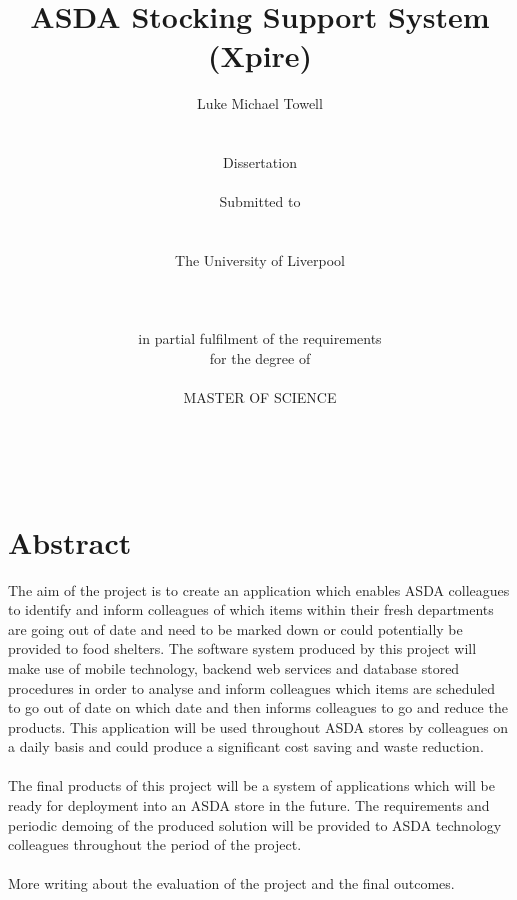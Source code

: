 \documentclass[a4paper,11pt]{report}
\begin{document}



\thispagestyle{empty}

\title{\LARGE
ASDA Stocking Support System (Xpire)}

\author{
Luke Michael Towell
\\    \\    \\
Dissertation
\\    \\
Submitted to 
\\    \\    \\ 
The University of Liverpool
\\    \\
\\    \\
in partial fulfilment of the requirements
\\
for the degree of 
\\     \\
MASTER OF SCIENCE
\\     \\    \\    \\
}


\date{}


\maketitle


\chapter*{\center Abstract}

The aim of the project is to create an application which enables ASDA colleagues to identify
and inform colleagues of which items within their fresh departments are going out of date and
need to be marked down or could potentially be provided to food shelters. The software system produced by this project will make use of mobile technology,
 backend web services and database stored procedures in order to analyse and inform colleagues which items are scheduled to go 
out of date on which date and then informs colleagues to go and reduce the products. This application
will be used throughout ASDA stores by colleagues on a daily basis and could produce a significant
cost saving and waste reduction.
\\
\\
The final products of this project will be a system of applications which will be ready for deployment
into an ASDA store in the future. The requirements and periodic demoing of the produced solution will
be provided to ASDA technology colleagues throughout the period of the project.
\\
\\
More writing about the evaluation of the project and the final outcomes. 
\newpage
\end{document}
